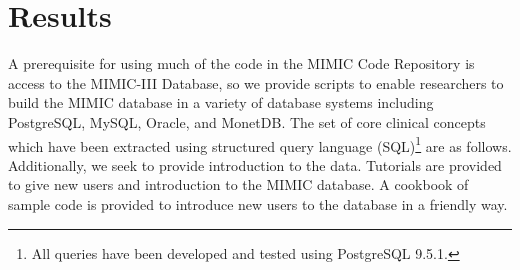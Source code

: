 \documentclass{elsart}
\begin{document}







\section{Results}

A prerequisite for using much of the code in the MIMIC Code Repository is access to the MIMIC-III Database, so we provide scripts to enable researchers to build the MIMIC database in a variety of database systems including PostgreSQL, MySQL, Oracle, and MonetDB. The set of core clinical concepts which have been extracted using structured query language (SQL)\footnote{All queries have been developed and tested using PostgreSQL 9.5.1.} are as follows. Additionally, we seek to provide introduction to the data. Tutorials are provided to give new users and introduction to the MIMIC database. A cookbook of sample code is provided to introduce new users to the database in a friendly way. 
\end{document}
